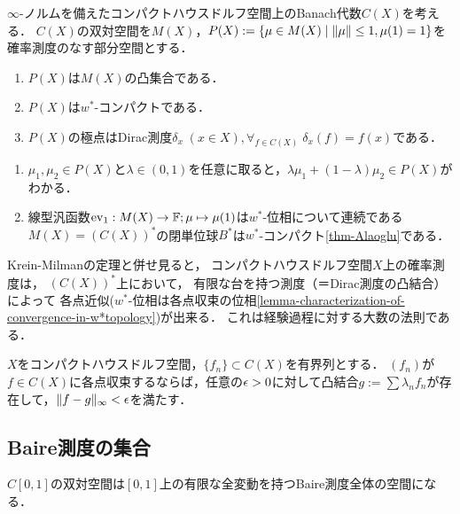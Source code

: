 \documentclass[uplatex,dvipdfmx]{jsreport}
\begin{document}
\begin{corollary}\label{cor-space-of-probability-measures}
    $\infty$-ノルムを備えたコンパクトハウスドルフ空間上のBanach代数$C(X)$を考える．
    $C(X)$の双対空間を$M(X)$，$P(X):=\left\{\mu\in M(X)\mid\|\mu\|\le 1,\mu(1)=1\right\}$を確率測度のなす部分空間とする．
    \begin{enumerate}
        \item $P(X)$は$M(X)$の凸集合である．
        \item $P(X)$は$w^*$-コンパクトである．
        \item $P(X)$の極点はDirac測度$\delta_x\;(x\in X),\forall_{f\in C(X)}\;\delta_x(f)=f(x)$である．
    \end{enumerate}
\end{corollary}
\begin{Proof}\mbox{}
    \begin{enumerate}
        \item $\mu_1,\mu_2\in P(X)$と$\lambda\in(0,1)$を任意に取ると，$\lambda\mu_1+(1-\lambda)\mu_2\in P(X)$がわかる．
        \item 線型汎函数$\mathrm{ev}_1:M(X)\to\mathbb{F};\mu\mapsto\mu(1)$は$w^*$-位相について連続である
        $M(X)=(C(X))^*$の閉単位球$B^*$は$w^*$-コンパクト\ref{thm-Alaoglu}である．
    \end{enumerate}
\end{Proof}
\begin{remarks}
    Krein-Milmanの定理と併せ見ると，
    コンパクトハウスドルフ空間$X$上の確率測度は，
    $(C(X))^*$上において，
    有限な台を持つ測度（＝Dirac測度の凸結合）によって
    各点近似($w^*$-位相は各点収束の位相\ref{lemma-characterization-of-convergence-in-w*topology})が出来る．
    これは経験過程に対する大数の法則である．
\end{remarks}

\begin{proposition}
    $X$をコンパクトハウスドルフ空間，$\{f_n\}\subset C(X)$を有界列とする．
    $(f_n)$が$f\in C(X)$に各点収束するならば，任意の$\epsilon>0$に対して凸結合$g:=\sum\lambda_nf_n$が存在して，$\|f-g\|_\infty<\epsilon$を満たす．
\end{proposition}

\subsection{Baire測度の集合}

\begin{tcolorbox}[colframe=ForestGreen, colback=ForestGreen!10!white,breakable,colbacktitle=ForestGreen!40!white,coltitle=black,fonttitle=\bfseries\sffamily,
title=]
    $C[0,1]$の双対空間は$[0,1]$上の有限な全変動を持つBaire測度全体の空間になる．
\end{tcolorbox}
\end{document}

